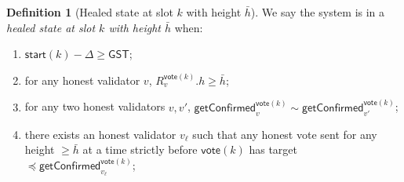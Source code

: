 \ifx\litemode\undefined\documentclass{article}\fi
\newcommand{\start}{\mathsf{start}}
\newcommand{\vote}{\mathsf{vote}}
\newcommand{\comm}[1]{\bar{#1}}
\newcommand{\getConfirmed}{\textsf{getConfirmed}\xspace}
\theoremstyle{plain}
\theoremstyle{definition}
\newtheorem{definition}{Definition}
\theoremstyle{remark}
\newcommand{\GST}{\ensuremath{\mathsf{GST}}}
\begin{document}
\begin{definition}[Healed state at slot $k$ with height $\comm{h}$]\label{rev:def:healed-state}
We say the system is in a \emph{healed state at slot $k$ with height $\comm{h}$} when:
\begin{enumerate}
  \item\label{rev:def:healed-state:sync} $\start(k) - \Delta \geq \GST$;
  \item\label{rev:def:healed-state:R} for any honest validator $v$, $R_v^{\vote(k)}.h \geq \comm{h}$;
  \item\label{rev:def:healed-state:gt-compat} for any two honest validators $v, v'$, $\getConfirmed_v^{\vote(k)} \sim \getConfirmed_{v'}^{\vote(k)}$;
  \item\label{rev:def:healed-state:target-cap} there exists an honest validator $v_\ell$ such that any honest vote sent for any height $\geq \comm{h}$ at a time strictly before $\vote(k)$ has target $\preceq \getConfirmed_{v_\ell}^{\vote(k)}$;
\end{enumerate}
\end{definition}
\end{document}
